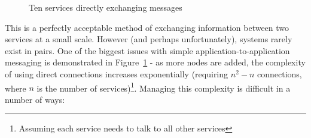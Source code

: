 \begin{figure}[ht]
  \centering
  
  \caption{Ten services directly exchanging messages}
  \label{fig:tikz:complexDirectMessaging}
\end{figure}

This is a perfectly acceptable method of exchanging information between two
services at a small scale. However (and perhaps unfortunately), systems rarely
exist in pairs. One of the biggest issues with simple application-to-application
messaging is demonstrated in Figure~\ref{fig:tikz:complexDirectMessaging} - as
more nodes are added, the complexity of using direct connections increases
exponentially (requiring $n^2 - n$ connections, where $n$ is the number of
services)\footnote{Assuming each service needs to talk to all other services}.
Managing this complexity is difficult in a number of ways:

